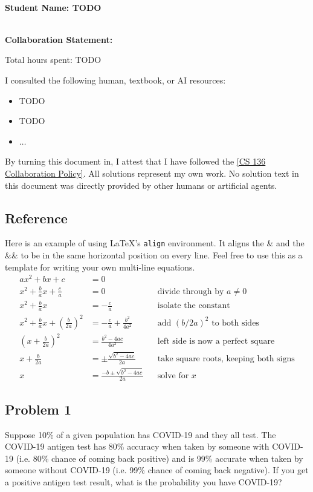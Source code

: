 \documentclass[10pt]{article}
\newcommand{\officialdirections}[1]{{\color{purple} #1}}
\begin{document}
~\\ %

{\Large{\bf Student Name: TODO}}

~\\ %
{\bf Collaboration Statement:}

Total hours spent: TODO

I consulted the following human, textbook, or AI resources:
\begin{itemize}
\item TODO
\item TODO
\item $\ldots$	
\end{itemize}

By turning this document in, I attest that I have followed the 
\href{https://www.cs.tufts.edu/cs/136/2026f/index.html#collaboration}{[CS 136 Collaboration Policy]}. All solutions represent my own work. No solution text in this document was directly provided by other humans or artificial agents. 

\tableofcontents

\subsection{Reference}
Here is an example of using \LaTeX's \texttt{align} environment. It aligns the \& and the \&\& to be in the same horizontal position on every line. Feel free to use this as a template for writing your own multi-line equations.
\begin{align*}
  ax^2 + bx + c &= 0 \\
  x^2 + \frac{b}{a}x + \frac{c}{a} &= 0
    \qquad && \text{divide through by $a \neq 0$} \\
  x^2 + \frac{b}{a}x &= -\frac{c}{a}
    && \text{isolate the constant} \\
  x^2 + \frac{b}{a}x + \left(\frac{b}{2a}\right)^2
    &= -\frac{c}{a} + \frac{b^2}{4a^2}
    && \text{add $(b/2a)^2$ to both sides} \\
  \left(x + \frac{b}{2a}\right)^2 &= \frac{b^2 - 4ac}{4a^2}
    && \text{left side is now a perfect square} \\
  x + \frac{b}{2a} &= \pm\frac{\sqrt{b^2 - 4ac}}{2a}
    && \text{take square roots, keeping both signs} \\
  x &= \frac{-b \pm \sqrt{b^2 - 4ac}}{2a}
    && \text{solve for $x$}
\end{align*}

\newpage
\officialdirections{
\subsection*{Problem 1}
Suppose 10\% of a given population has COVID-19 and they all test. The COVID-19 antigen test has 80\% accuracy when taken by someone with COVID-19 (i.e. 80\% chance of coming back positive) and is 99\% accurate when taken by someone without COVID-19 (i.e. 99\% chance of coming back negative). If you get a positive antigen test result, what is the probability you have COVID-19?
}
\end{document}
